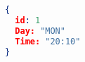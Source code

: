 \begin{lstlisting}[language=json,firstnumber=1]
{
  id: 1
  Day: "MON"
  Time: "20:10"
}
\end{lstlisting}